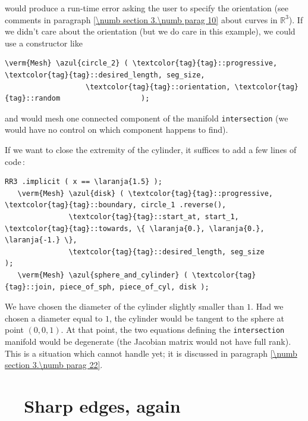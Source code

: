 \noindent would produce a run-time error asking the user to specify the orientation
(see comments in paragraph \ref{\numb section 3.\numb parag 10} about curves in $ \mathbb{R}^3 $).
If we didn't care about the orientation (but we do care in this example), we could use
a constructor like

\begin{Verbatim}[commandchars=\\\{\},formatcom=\small\tt,
   baselinestretch=0.94,framesep=2mm                     ]
   \verm{Mesh} \azul{circle_2} ( \textcolor{tag}{tag}::progressive, \textcolor{tag}{tag}::desired_length, seg_size,
                   \textcolor{tag}{tag}::orientation, \textcolor{tag}{tag}::random                   );
\end{Verbatim}

\noindent and {\maniFEM} would mesh one connected component of the manifold {\small\tt intersection}
(we would have no control on which component {\maniFEM} happens to find).

If we want to close the extremity of the cylinder, it suffices to add a few lines of code$\,$:

\begin{Verbatim}[commandchars=\\\{\},formatcom=\small\tt,
   baselinestretch=0.94,framesep=2mm                     ]
   RR3 .implicit ( x == \laranja{1.5} );
   \verm{Mesh} \azul{disk} ( \textcolor{tag}{tag}::progressive, \textcolor{tag}{tag}::boundary, circle_1 .reverse(),
               \textcolor{tag}{tag}::start_at, start_1, \textcolor{tag}{tag}::towards, \{ \laranja{0.}, \laranja{0.}, \laranja{-1.} \},
               \textcolor{tag}{tag}::desired_length, seg_size                         );
   \verm{Mesh} \azul{sphere_and_cylinder} ( \textcolor{tag}{tag}::join, piece_of_sph, piece_of_cyl, disk );
\end{Verbatim}

We have chosen the diameter of the cylinder slightly smaller than $1$.
Had we chosen a diameter equal to $1$, the cylinder would be tangent to the sphere at point
$ (0,0,1) $.
At that point, the two equations defining the {\small\tt intersection} manifold would be
degenerate (the Jacobian matrix would not have full rank).
This is a situation which {\maniFEM} cannot handle yet; it is discussed in paragraph
\ref{\numb section 3.\numb parag 22}.


\section{~~Sharp edges, again}\label{\numb section 3.\numb parag 19}

